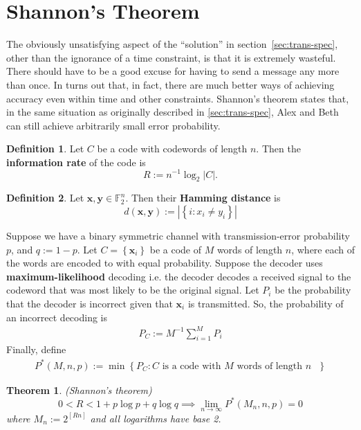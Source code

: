 \documentclass{article}
\renewcommand{\tt}[1]{\text{ #1 }}
\newcommand{\F}{\mathbb{F}}
\renewcommand{\=}{\equiv}
\renewcommand{\i}{^{-1}}
\newcommand{\ra}{\rightarrow}
\newcommand{\set}[1]{\left\{ #1 \right\}}
\renewcommand{\v}{\mathbf}
\newcommand{\x}{{\v x}}
\newcommand{\y}{{\v y}}
\theoremstyle{plain}
\newtheorem{thm}{Theorem}[subsection]
\theoremstyle{definition}
\newtheorem{defn}{Definition}[subsection]
\begin{document}
\section{Shannon's Theorem}

The obviously unsatisfying aspect of the ``solution'' in section~\ref{sec:trans-spec}, other than the ignorance of a time constraint, is that it is extremely wasteful. There should have to be a good excuse for having to send a message any more than once.
In turns out that, in fact, there are much better ways of achieving accuracy even within time and other constraints.
Shannon's theorem states that, in the same situation as originally described in \ref{sec:trans-spec}, Alex and Beth can still achieve arbitrarily small error probability.

\begin{defn} \label{eq:defR}
Let $C$ be a code with codewords of length $n$. Then the \textbf{information rate} of the code is
$$ R := n\i \log_2 |C|. $$
\end{defn}

\begin{defn}
Let $\x, \y \in \F_2^n$. Then their \textbf{Hamming distance} is
$$ d(\x, \y) := |\set{ i : x_i \neq y_i }| $$

Suppose we have a binary symmetric channel with transmission-error probability $p$, and $q := 1 - p$.
Let $C = \set{ \x_i }$ be a code of $M$ words of length $n$, where each of the words are encoded to with equal probability.
Suppose the decoder uses \textbf{maximum-likelihood} decoding i.e. the decoder decodes a received signal to the codeword that was most likely to be the original signal.
Let $P_i$ be the probability that the decoder is incorrect given that $\x_i$ is transmitted.
So, the probability of an incorrect decoding is
\begin{align}
  P_C := M\i \sum_{i=1}^M P_i
\end{align}
Finally, define
\begin{align}
  P^*(M, n, p) := \min\set{ P_C : C \tt{is a code with $M$ words of length $n$} }
\end{align}
\end{defn}

\begin{thm}
  (Shannon's theorem)
  $$
  0 < R < 1 + p \log p + q \log q
  \implies \lim_{n \ra \infty} P^*(M_n, n, p) = 0
  $$
  where $M_n := 2^{[Rn]}$ and all logarithms have base 2.
\end{thm}
\end{document}
